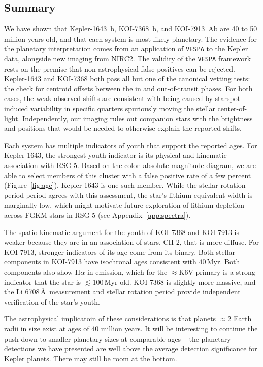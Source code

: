 \documentclass[12pt,twocolumn]{aastex63}
\begin{document}
\subsection{Summary}

We have shown that Kepler-1643~b, KOI-7368~b, and KOI-7913~Ab are 40
to 50 million years old, and that each system is most likely
planetary.  The evidence for the planetary interpretation comes from
an application of \texttt{VESPA} to the Kepler data, alongside new
imaging from NIRC2.  The validity of the \texttt{VESPA} framework
rests on the premise that non-astrophysical false positives can be
rejected.  Kepler-1643 and KOI-7368 both pass all but one of the
canonical vetting tests: the check for centroid offsets between the in
and out-of-transit phases.  For both cases, the weak observed shifts
are consistent with being caused by starspot-induced variability in
specific quarters spuriously moving the stellar center-of-light.
Independently, our imaging rules out companion stars with the brightness
and positions that would be needed to otherwise explain the reported shifts.

Each system has multiple indicators of youth that support the reported
ages.  For Kepler-1643, the strongest youth indicator is its physical
and kinematic association with RSG-5.  Based on the color--absolute
magnitude diagram, we are able to select members of this cluster with
a false positive rate of a few percent (Figure~\ref{fig:age}).
Kepler-1643 is one such member.  While the stellar rotation period
period agrees with this assessment, the star's lithium equivalent
width is marginally low, which might motivate future exploration of
lithium depletion across FGKM stars in RSG-5 (see
Appendix~\ref{app:spectra}).

The spatio-kinematic argument for the youth of KOI-7368 and KOI-7913
is weaker because they are in an association of stars, CH-2, that is
more diffuse.  For KOI-7913, stronger indicators of its age come from
its binary.  Both stellar components in KOI-7913 have isochronal ages
consistent with $40$\,Myr.  Both components also show H$\alpha$ in
emission, which for the $\approx$K6V primary is a strong indicator
that the star is $\lesssim$100$\,$Myr old.  KOI-7368 is slightly more
massive, and the Li 6708\,\AA\ measurement and stellar rotation period
provide independent verification of the star's youth.

The astrophysical implicatoin of these considerations is that planets
$\approx$2 Earth radii in size exist at ages of 40 million years.  It
will be interesting to continue the push down to smaller planetary
sizes at comparable ages -- the planetary detections we have presented
are well above the average detection significance for Kepler planets.
There may still be room at the bottom.
\end{document}
